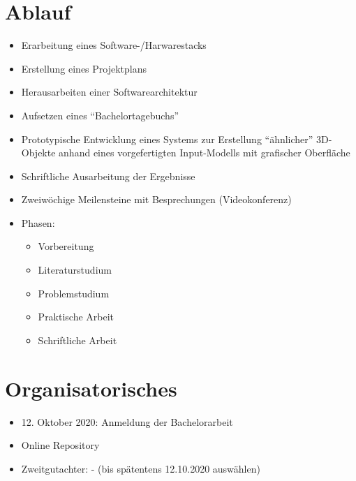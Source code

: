 \documentclass[11pt]{article}
\begin{document}
    \section{Ablauf}
    \begin{itemize}
        \item Erarbeitung eines Software-/Harwarestacks
        \item Erstellung eines Projektplans
        \item Herausarbeiten einer Softwarearchitektur
        \item Aufsetzen eines "`Bachelortagebuchs"'
        \item Prototypische Entwicklung eines Systems zur Erstellung "`ähnlicher"' 3D-Objekte anhand eines
        vorgefertigten Input-Modells mit grafischer Oberfläche
        \item Schriftliche Ausarbeitung der Ergebnisse
        \item Zweiwöchige Meilensteine mit Besprechungen (Videokonferenz)
        \item Phasen:
        \begin{itemize}
            \item Vorbereitung
            \item Literaturstudium
            \item Problemstudium
            \item Praktische Arbeit
            \item Schriftliche Arbeit
        \end{itemize}
    \end{itemize}

    \section{Organisatorisches}
    \begin{itemize}
        \item 12. Oktober 2020: Anmeldung der Bachelorarbeit
        \item Online Repository~\cite{github}
        \item Zweitgutachter: - (bis spätentens 12.10.2020 auswählen)
    \end{itemize}

    \newpage
\end{document}
